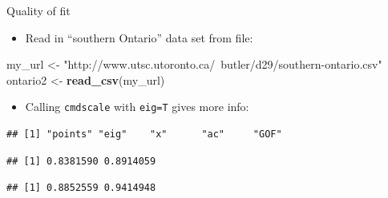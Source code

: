\documentclass[ignorenonframetext,]{beamer}
\newenvironment{Shaded}{\begin{snugshade}}{\end{snugshade}}
\newcommand{\DataTypeTok}[1]{\textcolor[rgb]{0.13,0.29,0.53}{#1}}
\newcommand{\DecValTok}[1]{\textcolor[rgb]{0.00,0.00,0.81}{#1}}
\newcommand{\FloatTok}[1]{\textcolor[rgb]{0.00,0.00,0.81}{#1}}
\newcommand{\KeywordTok}[1]{\textcolor[rgb]{0.13,0.29,0.53}{\textbf{#1}}}
\newcommand{\NormalTok}[1]{#1}
\newcommand{\OperatorTok}[1]{\textcolor[rgb]{0.81,0.36,0.00}{\textbf{#1}}}
\newcommand{\StringTok}[1]{\textcolor[rgb]{0.31,0.60,0.02}{#1}}
\providecommand{\tightlist}{%
  \setlength{\itemsep}{0pt}\setlength{\parskip}{0pt}}
\begin{document}
\begin{frame}[fragile]{Quality of fit}
\protect\hypertarget{quality-of-fit}{}

\begin{itemize}
\tightlist
\item
  Read in ``southern Ontario'' data set from file:
\end{itemize}

\begin{Shaded}
\begin{Highlighting}[]
\NormalTok{my_url <-}\StringTok{ "http://www.utsc.utoronto.ca/~butler/d29/southern-ontario.csv"}
\NormalTok{ontario2 <-}\StringTok{ }\KeywordTok{read_csv}\NormalTok{(my_url)}
\end{Highlighting}
\end{Shaded}

\begin{itemize}
\tightlist
\item
  Calling \texttt{cmdscale} with \texttt{eig=T} gives more info:
\end{itemize}

\begin{Shaded}
\end{Shaded}

\begin{verbatim}
## [1] "points" "eig"    "x"      "ac"     "GOF"
\end{verbatim}

\begin{Shaded}
\end{Shaded}

\begin{verbatim}
## [1] 0.8381590 0.8914059
\end{verbatim}

\begin{Shaded}
\end{Shaded}

\begin{verbatim}
## [1] 0.8852559 0.9414948
\end{verbatim}

\end{frame}
\end{document}
